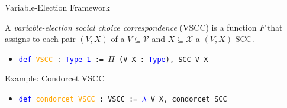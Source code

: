 \documentclass[12pt,xcolor=svgnames,blue,aspectratio=169]{beamer}
\begin{document}
\begin{frame}{Variable-Election Framework}

\begin{definition}\label{VSCC} A \textit{variable-election social choice correspondence} (VSCC) is a function $F$ that assigns to each pair $(V,X)$ of a $V\subseteq \mathcal{V}$ and $X\subseteq\mathcal{X}$ a $(V,X)$-SCC. %
\end{definition}


\vfill 

\begin{itemize}
\item[] \texttt{\textcolor{blue}{def} \textcolor{orange}{VSCC} : \textcolor{blue}{Type 1} := $\Pi$ (V X : \textcolor{blue}{Type}), SCC V X}
\end{itemize}

\vfill 
\pause 
Example: Condorcet VSCC\\
\begin{itemize}
\item[] \texttt{\textcolor{blue}{def} \textcolor{orange}{condorcet\_VSCC} : VSCC := \textcolor{blue}{$\lambda$} V X, condorcet\_SCC}
\end{itemize}

\end{frame}
\end{document}
